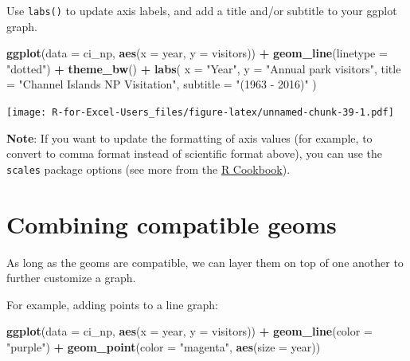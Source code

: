 \documentclass[]{book}
\newenvironment{Shaded}{\begin{snugshade}}{\end{snugshade}}
\newcommand{\DataTypeTok}[1]{\textcolor[rgb]{0.13,0.29,0.53}{#1}}
\newcommand{\KeywordTok}[1]{\textcolor[rgb]{0.13,0.29,0.53}{\textbf{#1}}}
\newcommand{\NormalTok}[1]{#1}
\newcommand{\OperatorTok}[1]{\textcolor[rgb]{0.81,0.36,0.00}{\textbf{#1}}}
\newcommand{\StringTok}[1]{\textcolor[rgb]{0.31,0.60,0.02}{#1}}
\begin{document}
Use \texttt{labs()} to update axis labels, and add a title and/or subtitle to your ggplot graph.

\begin{Shaded}
\begin{Highlighting}[]
\KeywordTok{ggplot}\NormalTok{(}\DataTypeTok{data =}\NormalTok{ ci_np, }\KeywordTok{aes}\NormalTok{(}\DataTypeTok{x =}\NormalTok{ year, }\DataTypeTok{y =}\NormalTok{ visitors)) }\OperatorTok{+}
\StringTok{  }\KeywordTok{geom_line}\NormalTok{(}\DataTypeTok{linetype =} \StringTok{"dotted"}\NormalTok{) }\OperatorTok{+}
\StringTok{  }\KeywordTok{theme_bw}\NormalTok{() }\OperatorTok{+}
\StringTok{  }\KeywordTok{labs}\NormalTok{(}
    \DataTypeTok{x =} \StringTok{"Year"}\NormalTok{,}
    \DataTypeTok{y =} \StringTok{"Annual park visitors"}\NormalTok{,}
    \DataTypeTok{title =} \StringTok{"Channel Islands NP Visitation"}\NormalTok{,}
    \DataTypeTok{subtitle =} \StringTok{"(1963 - 2016)"}
\NormalTok{  )}
\end{Highlighting}
\end{Shaded}

\texttt{[image: R-for-Excel-Users\_files/figure-latex/unnamed-chunk-39-1.pdf]}

\textbf{Note}: If you want to update the formatting of axis values (for example, to convert to comma format instead of scientific format above), you can use the \texttt{scales} package options (see more from the \href{http://www.cookbook-r.com/Graphs/Axes_(ggplot2)/}{R Cookbook}).

\hypertarget{combining-compatible-geoms}{%
\section{Combining compatible geoms}\label{combining-compatible-geoms}}

As long as the geoms are compatible, we can layer them on top of one another to further customize a graph.

For example, adding points to a line graph:

\begin{Shaded}
\begin{Highlighting}[]
\KeywordTok{ggplot}\NormalTok{(}\DataTypeTok{data =}\NormalTok{ ci_np, }\KeywordTok{aes}\NormalTok{(}\DataTypeTok{x =}\NormalTok{ year, }\DataTypeTok{y =}\NormalTok{ visitors)) }\OperatorTok{+}
\StringTok{  }\KeywordTok{geom_line}\NormalTok{(}\DataTypeTok{color =} \StringTok{"purple"}\NormalTok{) }\OperatorTok{+}
\StringTok{  }\KeywordTok{geom_point}\NormalTok{(}\DataTypeTok{color =} \StringTok{"magenta"}\NormalTok{,}
             \KeywordTok{aes}\NormalTok{(}\DataTypeTok{size =}\NormalTok{ year))}
\end{Highlighting}
\end{Shaded}
\end{document}
